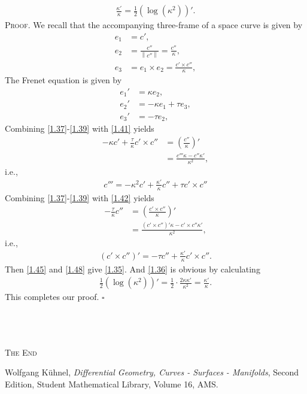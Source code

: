 \documentclass[a4paper]{article}
\numberwithin{equation}{section}
\begin{document}
\begin{align}
\label{1.36}
\frac{{\kappa '}}{\kappa } = \frac{1}{2}\left( {\log \left( {{\kappa ^2}} \right)} \right)'.
\end{align}
\textsc{Proof.} We recall that the accompanying three-frame of a space curve is given by
\begin{align}
\label{1.37}
{e_1} &= c',\\
{e_2} &= \frac{{c''}}{{\left\| {c''} \right\|}} = \frac{{c''}}{\kappa },\\
{e_3} &= {e_1} \times {e_2} = \frac{{c' \times c''}}{\kappa }, \label{1.39}
\end{align}
The Frenet equation is given by
\begin{align}
\label{1.40}
{e_1}' &= \kappa {e_2},\\
{e_2}' &=  - \kappa {e_1} + \tau {e_3},\label{1.41}\\
{e_3}' &=  - \tau {e_2}, \label{1.42}
\end{align} 
Combining \eqref{1.37}-\eqref{1.39} with \eqref{1.41} yields
\begin{align}
 - \kappa c' + \frac{\tau }{\kappa }c' \times c'' &= \left( {\frac{{c''}}{\kappa }} \right)'\\
& = \frac{{c'''\kappa  - c''\kappa '}}{{{\kappa ^2}}},
\end{align}
i.e.,
\begin{align}
\label{1.45}
c''' =  - {\kappa ^2}c' + \frac{{\kappa '}}{\kappa }c'' + \tau c' \times c''
\end{align}
Combining \eqref{1.37}-\eqref{1.39} with \eqref{1.42} yields
\begin{align}
 - \frac{\tau }{\kappa }c'' &= \left( {\frac{{c' \times c''}}{\kappa }} \right)'\\
 &= \frac{{\left( {c' \times c''} \right)'\kappa  - c' \times c''\kappa '}}{{{\kappa ^2}}},
\end{align}
i.e.,
\begin{align}
\label{1.48}
\left( {c' \times c''} \right)' =  - \tau c'' + \frac{{\kappa '}}{\kappa }c' \times c''.
\end{align}
Then \eqref{1.45} and \eqref{1.48} give \eqref{1.35}. And \eqref{1.36} is obvious by calculating
\begin{align}
\frac{1}{2}\left( {\log \left( {{\kappa ^2}} \right)} \right)' = \frac{1}{2} \cdot \frac{{2\kappa \kappa '}}{{{\kappa ^2}}} = \frac{{\kappa '}}{\kappa }.
\end{align}
This completes our proof. \hfill $\square$\\
\\
\\
\\
\begin{center}
\textsc{The End}
\end{center}
\newpage
\begin{thebibliography}{999}
 Wolfgang K\"{u}hnel, \textit{Differential Geometry, Curves - Surfaces - Manifolds}, Second Edition, Student Mathematical Library, Volume 16, AMS.
\end{thebibliography}
\end{document}
